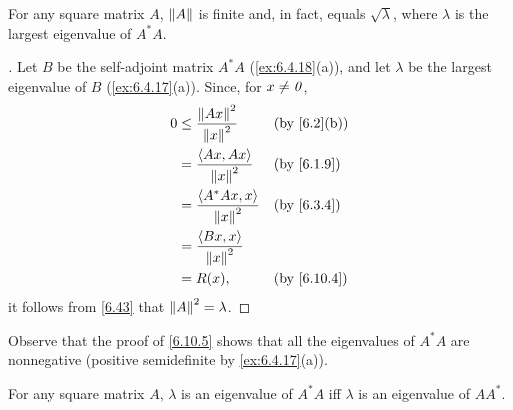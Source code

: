 \begin{cor}\label{6.10.5}
  For any square matrix \(A\), \(\left\lVert A\right\rVert\) is finite and, in fact, equals \(\sqrt{\lambda}\), where \(\lambda\) is the largest eigenvalue of \(A^* A\).
\end{cor}

\begin{proof}[]
  Let \(B\) be the self-adjoint matrix \(A^* A\) (\cref{ex:6.4.18}(a)), and let \(\lambda\) be the largest eigenvalue of \(B\) (\cref{ex:6.4.17}(a)).
  Since, for \(x \neq \mathit{0}\),
  \begin{align*}
    0 & \leq \dfrac{\norm{Ax}^2}{\norm{x}^2}   &  & \by{6.2}[b] \\
      & = \dfrac{\inn{Ax, Ax}}{\norm{x}^2}     &  & \by{6.1.9}  \\
      & = \dfrac{\inn{A^* A x, x}}{\norm{x}^2} &  & \by{6.3.4}  \\
      & = \dfrac{\inn{Bx, x}}{\norm{x}^2}                       \\
      & = R(x),                                &  & \by{6.10.4}
  \end{align*}
  it follows from \cref{6.43} that \(\left\lVert A\right\rVert^2 = \lambda\).
\end{proof}

\begin{note}
  Observe that the proof of \cref{6.10.5} shows that all the eigenvalues of \(A^* A\) are nonnegative
  (positive semidefinite by \cref{ex:6.4.17}(a)).
\end{note}

\begin{lem}\label{6.10.6}
  For any square matrix \(A\), \(\lambda\) is an eigenvalue of \(A^* A\) iff \(\lambda\) is an eigenvalue of \(A A^*\).
\end{lem}


